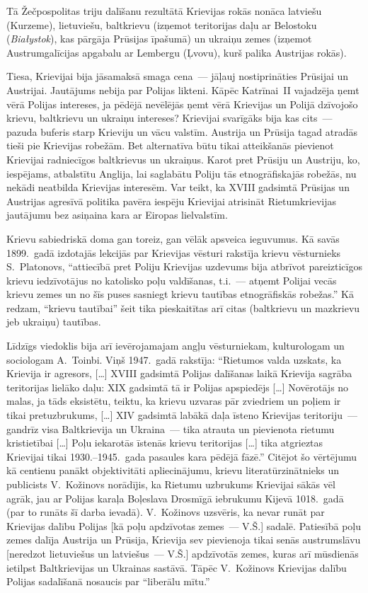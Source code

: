 \documentclass[twoside,a5paper,12pt,fleqn,openany]{extbook}
\newcommand{\pltxti}[1]{\textit{\textpolish{#1}}}
\newcommand{\citespace}{[\dots{}]}
\begin{document}
Tā Žečpospolitas triju dalīšanu rezultātā Krievijas rokās nonāca latviešu (Kurzeme), lietuviešu, baltkrievu (izņemot teritorijas daļu ar Belostoku (\pltxti{Białystok}), kas pārgāja Prūsijas īpašumā) un ukraiņu zemes (izņemot Austrumgalīcijas apgabalu ar Lembergu (Ļvovu), kurš palika Austrijas rokās).

Tiesa, Krievijai bija jāsamaksā smaga cena~--- jāļauj nostiprināties Prūsijai un Austrijai. Jautājums nebija par Polijas likteni. Kāpēc Katrīnai~II vajadzēja ņemt vērā Polijas intereses, ja pēdējā nevēlējās ņemt vērā Krievijas un Polijā dzīvojošo krievu, baltkrievu un ukraiņu intereses? Krievijai svarīgāks bija kas cits~--- pazuda buferis starp Krieviju un vācu valstīm. Austrija un Prūsija tagad atradās tieši pie Krievijas robežām. Bet alternatīva būtu tikai atteikšanās pievienot Krievijai radniecīgos baltkrievus un ukraiņus. Karot pret Prūsiju un Austriju, ko, iespējams, atbalstītu Anglija, lai saglabātu Poliju tās etnogrāfiskajās robežās, nu nekādi neatbilda Krievijas interesēm. Var teikt, ka XVIII gadsimtā Prūsijas un Austrijas agresīvā politika pavēra iespēju Krievijai atrisināt Rietumkrievijas jautājumu bez asiņaina kara ar Eiropas lielvalstīm.

Krievu sabiedriskā doma gan toreiz, gan vēlāk apsveica ieguvumus. Kā savās 1899.~gadā izdotajās lekcijās par Krievijas vēsturi rakstīja krievu vēsturnieks S.~Platonovs, ``attiecībā pret Poliju Krievijas uzdevums bija atbrīvot pareizticīgos krievu iedzīvotājus no katolisko poļu valdīšanas, t.i.~--- atņemt Polijai vecās krievu zemes un no šīs puses sasniegt krievu tautības etnogrāfiskās robežas.'' Kā redzam, ``krievu tautībai'' šeit tika pieskaitītas arī citas (baltkrievu un mazkrievu jeb ukraiņu) tautības.

Līdzīgs viedoklis bija arī ievērojamajam angļu vēsturniekam, kulturologam un sociologam A.~Toinbi. Viņš 1947.~gadā rakstīja: ``Rietumos valda uzskats, ka Krievija ir agresors, \citespace{} XVIII gadsimtā Polijas dalīšanas laikā Krievija sagrāba teritorijas lielāko daļu: XIX gadsimtā tā ir Polijas apspiedējs \citespace{} Novērotājs no malas, ja tāds eksistētu, teiktu, ka krievu uzvaras pār zviedriem un poļiem ir tikai pretuzbrukums, \citespace{} XIV gadsimtā labākā daļa īsteno Krievijas teritoriju~--- gandrīz visa Baltkrievija un Ukraina~--- tika atrauta un pievienota rietumu kristietībai \citespace{} Poļu iekarotās īstenās krievu teritorijas \citespace{} tika atgrieztas Krievijai tikai 1930.--1945.~gada pasaules kara pēdējā fāzē.'' Citējot šo vērtējumu kā centienu panākt objektivitāti apliecinājumu, krievu literatūrzinātnieks un publicists V.~Kožinovs norādījis, ka Rietumu uzbrukums Krievijai sākās vēl agrāk, jau ar Polijas karaļa Boļeslava Drosmīgā iebrukumu Kijevā 1018.~gadā (par to runāts šī darba ievadā). V.~Kožinovs uzsvēris, ka nevar runāt par Krievijas dalību Polijas [kā poļu apdzīvotas zemes~--- V.Š.] sadalē. Patiesībā poļu zemes dalīja Austrija un Prūsija, Krievija sev pievienoja tikai senās austrumslāvu [neredzot lietuviešus un latviešus~--- V.Š.] apdzīvotās zemes, kuras arī mūsdienās ietilpst Baltkrievijas un Ukrainas sastāvā. Tāpēc V.~Kožinovs Krievijas dalību Polijas sadalīšanā nosaucis par ``liberālu mītu.''
\end{document}
